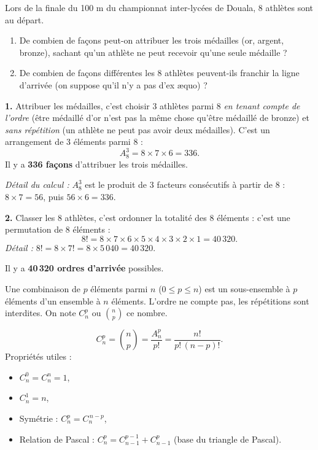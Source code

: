 \documentclass[11pt]{article}
\newcommand{\cle}[1]{{\popxbold\color{popdark}#1}}
\newcounter{popsec}
\newcounter{popsub}
\newcommand{\courssub}[1]{%
  \stepcounter{popsub}%
  \par\vspace{9pt}\noindent{\popxbold\fontsize{11.5}{13}\selectfont\color{popink}{\color{poporange}\thepopsec.\thepopsub}\hspace{6pt}#1}\par\nopagebreak\vspace{4pt}
}
\begin{document}
\begin{exoresolu}
Lors de la finale du 100 m du championnat inter-lycées de Douala, 8 athlètes sont au départ.
\begin{enumerate}
\item De combien de façons peut-on attribuer les trois médailles (or, argent, bronze), sachant qu'un athlète ne peut recevoir qu'une seule médaille ?
\item De combien de façons différentes les 8 athlètes peuvent-ils franchir la ligne d'arrivée (on suppose qu'il n'y a pas d'ex æquo) ?
\end{enumerate}
\tcblower
\textbf{1.} Attribuer les médailles, c'est choisir 3 athlètes parmi 8 \emph{en tenant compte de l'ordre} (être médaillé d'or n'est pas la même chose qu'être médaillé de bronze) et \emph{sans répétition} (un athlète ne peut pas avoir deux médailles). C'est un arrangement de 3 éléments parmi 8 :
\[ A_8^3=8\times 7\times 6=336. \]
Il y a \textbf{336 façons} d'attribuer les trois médailles.

\emph{Détail du calcul :} $A_8^3$ est le produit de 3 facteurs consécutifs à partir de 8 : $8\times 7=56$, puis $56\times 6=336$.

\textbf{2.} Classer les 8 athlètes, c'est ordonner la totalité des 8 éléments : c'est une permutation de 8 éléments :
\[ 8!=8\times 7\times 6\times 5\times 4\times 3\times 2\times 1=40\,320. \]
\emph{Détail :} $8!=8\times 7!=8\times 5\,040=40\,320$.

Il y a \textbf{40\,320 ordres d'arrivée} possibles.
\end{exoresolu}

\courssub{Combinaisons}

\begin{definition}[Combinaison]
Une \cle{combinaison} de $p$ éléments parmi $n$ ($0\leq p\leq n$) est un \cle{sous-ensemble} à $p$ éléments d'un ensemble à $n$ éléments. L'ordre ne compte pas, les répétitions sont interdites. On note $C_n^p$ ou $\binom{n}{p}$ ce nombre.
\end{definition}

\begin{propriete}
\[ C_n^p = \binom{n}{p} = \frac{A_n^p}{p!} = \frac{n!}{p!\,(n-p)!}. \]
Propriétés utiles :
\begin{itemize}
\item $C_n^0 = C_n^n = 1$,
\item $C_n^1 = n$,
\item \cle{Symétrie} : $C_n^p = C_n^{\,n-p}$,
\item \cle{Relation de Pascal} : $C_n^p = C_{n-1}^{p-1} + C_{n-1}^p$ (base du triangle de Pascal).
\end{itemize}
\end{propriete}
\end{document}
